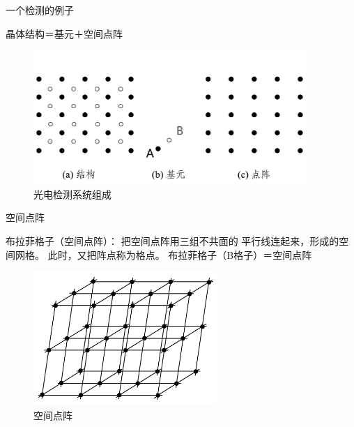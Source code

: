 \documentclass[trans]{beamer} %
\begin{document}
\begin{frame}{一个检测的例子}
\begin{underline}晶体结构＝基元＋空间点阵
\end{underline}
 
  \begin{figure}[htbp] 
    \centering\includegraphics[height=2in]{source/ch2/fg202.png} 
    \caption{光电检测系统组成}\label{fig:joy}
    \end{figure} 
 
 \end{frame}
\begin{frame}{空间点阵}
    

    \begin{alertblock}{布拉菲格子（空间点阵）：}
    把空间点阵用三组不共面的             平行线连起来，形成的空间网格。               此时，又把阵点称为格点。
布拉菲格子（B格子）＝空间点阵
    \end{alertblock}
    \begin{figure}[htbp] 
    \centering\includegraphics[height=2in]{source/ch2/fg203.png} 
    \caption{空间点阵}\label{fig:jy}
    \end{figure}  
\end{frame}
\end{document}
